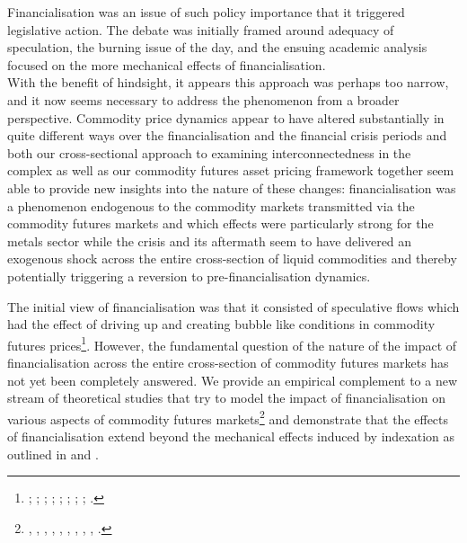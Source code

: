 \documentclass[
  authoryear,
  preprint,
  3p]{elsarticle}
\begin{document}
\bigskip
\bigskip

Financialisation was an issue of such policy importance that it
triggered legislative action. The debate was initially framed around
adequacy of speculation, the burning issue of the day, and the ensuing
academic analysis focused on the more mechanical effects of
financialisation.\\
With the benefit of hindsight, it appears this approach was perhaps too
narrow, and it now seems necessary to address the phenomenon from a
broader perspective. Commodity price dynamics appear to have altered
substantially in quite different ways over the financialisation and the
financial crisis periods and both our cross-sectional approach to
examining interconnectedness in the complex as well as our commodity
futures asset pricing framework together seem able to provide new
insights into the nature of these changes: financialisation was a
phenomenon endogenous to the commodity markets transmitted via the
commodity futures markets and which effects were particularly strong for
the metals sector while the crisis and its aftermath seem to have
delivered an exogenous shock across the entire cross-section of liquid
commodities and thereby potentially triggering a reversion to
pre-financialisation dynamics.

The initial view of financialisation was that it consisted of
speculative flows which had the effect of driving up and creating bubble
like conditions in commodity futures prices\footnote{\citet{masters_testimony_2008};
  \citet{masters_accidental_2008}; \citet{unctad_global_2009};
  \citet{deschutter_food_2010}; \citet{gilbert_how_2010};
  \citet{gilbert_speculative_2010}; \citet{herman_not_2011};
  \citet{schumann_hunger_2011}; \citet{singleton_investor_2013}.}.
However, the fundamental question of the nature of the impact of
financialisation across the entire cross-section of commodity futures
markets has not yet been completely answered. We provide an empirical
complement to a new stream of theoretical studies that try to model the
impact of financialisation on various aspects of commodity futures
markets\footnote{\citet{etula_broker-dealer_2013},
  \citet{acharya_limits_2013}, \citet{cheng_convective_2014},
  \citet{leclercq_equilibrium_2014}, \citet{sockin_informational_2015},
  \citet{goldstein_speculation_2014}, \citet{ekeland_speculation_2016},
  \citet{goldstein_commodity_2022}, \citet{ekeland_hedging_2019},
  \citet{isleimeyyeh_role_2020}.} and demonstrate that the effects of
financialisation extend beyond the mechanical effects induced by
indexation as outlined in \citet{tang_index_2012} and
\citet{basak_model_2016}.
\end{document}

